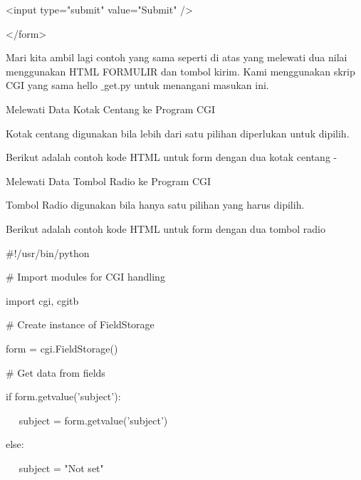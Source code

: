 \begin {enumerate}
\begin {enumerate}
\noindent
<input type="submit" value="Submit" /> \par
\noindent
</form> \par
\vspace{12pt}
Mari kita ambil lagi contoh yang sama seperti di atas yang melewati dua nilai menggunakan HTML FORMULIR dan tombol kirim. Kami menggunakan skrip CGI yang sama hello $  \_  $get.py untuk menangani masukan ini. \par
\noindent
Melewati Data Kotak Centang ke Program CGI \par
\vspace{12pt}
\noindent
Kotak centang digunakan bila lebih dari satu pilihan diperlukan untuk dipilih. \par
\vspace{12pt}
\noindent
Berikut adalah contoh kode HTML untuk form dengan dua kotak centang - \par
\vspace{12pt}
\noindent
Melewati Data Tombol Radio ke Program CGI \par
\vspace{12pt}
\noindent
Tombol Radio digunakan bila hanya satu pilihan yang harus dipilih. \par
\vspace{12pt}
\noindent
Berikut adalah contoh kode HTML untuk form dengan dua tombol radio  \par
\vspace{12pt}
\vspace{12pt}
\noindent
 $  \#  $!/usr/bin/python \par
\vspace{12pt}
\noindent
 $  \#  $ Import modules for CGI handling  \par
\noindent
import cgi, cgitb  \par
\vspace{12pt}
\noindent
 $  \#  $ Create instance of FieldStorage  \par
\noindent
form = cgi.FieldStorage()  \par
\vspace{12pt}
\noindent
 $  \#  $ Get data from fields \par
\noindent
if form.getvalue('subject'): \par
\noindent
~~ subject = form.getvalue('subject') \par
\noindent
else: \par
\noindent
~~ subject = "Not set" \par
\vspace{12pt}
\noindent

\end{enumerate}
\end{enumerate}
